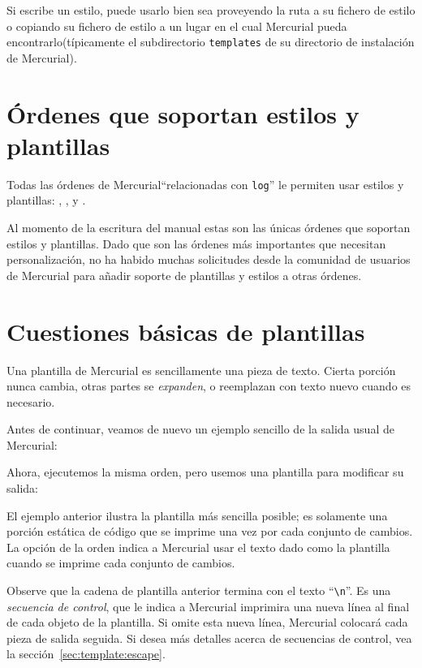 Si escribe un estilo, puede usarlo bien sea proveyendo la ruta a su
fichero de estilo o copiando su fichero de estilo a un lugar en el
cual Mercurial pueda encontrarlo(típicamente el subdirectorio
\texttt{templates} de su directorio de instalación de Mercurial).

\section{Órdenes que soportan estilos y plantillas}

Todas las órdenes de Mercurial``relacionadas con \texttt{log}'' le
permiten usar estilos y plantillas: , ,
 y .

Al momento de la escritura del manual estas son las únicas órdenes que
soportan estilos y plantillas.  Dado que son las órdenes más
importantes que necesitan personalización, no ha habido muchas
solicitudes desde la comunidad de usuarios de Mercurial para añadir
soporte de plantillas y estilos a otras órdenes.

\section{Cuestiones básicas de plantillas}

Una plantilla de Mercurial es sencillamente una pieza de texto.
Cierta porción nunca cambia, otras partes se \emph{expanden}, o
reemplazan con texto nuevo cuando es necesario.

Antes de continuar, veamos de nuevo un ejemplo sencillo de la salida
usual de Mercurial:


Ahora, ejecutemos la misma orden, pero usemos una plantilla para
modificar su salida:


El ejemplo anterior ilustra la plantilla más sencilla posible;  es
solamente una porción estática de código que se imprime una vez por
cada conjunto de cambios.  La opción  de la
orden  indica a Mercurial usar el texto dado como la
plantilla cuando se imprime cada conjunto de cambios.

Observe que la cadena de plantilla anterior termina con el texto
``\Verb+\n+''.  Es una \emph{secuencia de control}, que le indica a
Mercurial imprimira una nueva línea al final de cada objeto de la
plantilla.  Si omite esta nueva línea, Mercurial colocará cada pieza
de salida seguida.  Si desea más detalles acerca de secuencias de
control, vea la sección~\ref{sec:template:escape}.

